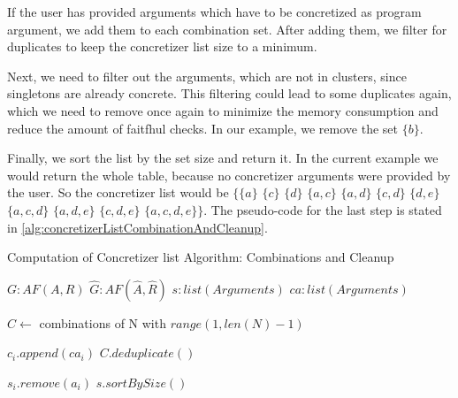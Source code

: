 If the user has provided arguments which have to be concretized as program argument, we add them to each combination set. After adding them, we filter for duplicates to keep the concretizer list size to a minimum.

Next, we need to filter out the arguments, which are not in clusters, since singletons are already concrete. This filtering could lead to some duplicates again, which we need to remove once again to minimize the memory consumption and reduce the amount of faitfhul checks. In our example, we remove the set $\{b\}$.

Finally, we sort the list by the set size and return it. In the current example we would return the whole table, because no concretizer arguments were provided by the user. So the concretizer list would be
$\bigl\{\{a\}$
$\{c\}$
$\{d\}$
$\{a, c\}$
$\{a, d\}$
$\{c, d\}$
$\{d, e\}$
$\{a, c, d\}$
$\{a, d, e\}$
$\{c, d, e\}$
$\{a, c, d, e\}\bigl\}$. The pseudo-code for the last step is stated in \cref{alg:concretizerListCombinationAndCleanup}.


\begin{algorithm}
    \caption{Computation of Concretizer list Algorithm: Combinations and Cleanup}\label{alg:concretizerListCombinationAndCleanup}
    \begin{algorithmic}[1]
        \Require $G: AF(A, R)$ 
        \Require $\hat{G}: AF(\hat{A}, \hat{R})$ 
        \Require $s: list(Arguments)$ 
        \Require $ca: list(Arguments)$ 

        \State $C \gets$ combinations of N with $range(1, len(N)-1)$ 

         
                \State $c_i.append(ca_i)$
            \EndFor
        \EndFor
        \State $C.deduplicate()$

         
                    \State $s_i.remove(a_i)$
                \EndIf
            \EndFor
        \EndFor
        \State \Return $s.sortBySize()$
    \end{algorithmic}
\end{algorithm}

